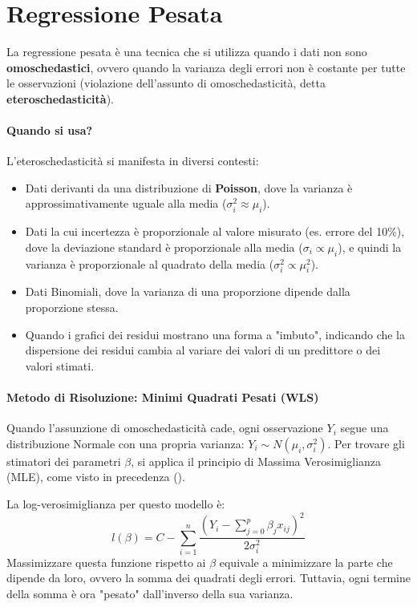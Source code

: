 \section{Regressione Pesata}

La regressione pesata è una tecnica che si utilizza quando i dati non sono
\textbf{omoschedastici}, ovvero quando la varianza degli errori non è costante
per tutte le osservazioni (violazione dell'assunto di omoschedasticità, detta
\textbf{eteroschedasticità}).

\paragraph{Quando si usa?}
L'eteroschedasticità si manifesta in diversi contesti:
\begin{itemize}
    \item Dati derivanti da una distribuzione di \textbf{Poisson}, dove la
    varianza è approssimativamente uguale alla media (\(\sigma_i^2 \approx
    \mu_i\)).
    \item Dati la cui incertezza è proporzionale al valore misurato (es. errore
    del 10\%), dove la deviazione standard è proporzionale alla media
    (\(\sigma_i \propto \mu_i\)), e quindi la varianza è proporzionale al
    quadrato della media (\(\sigma_i^2 \propto \mu_i^2\)).
    \item Dati Binomiali, dove la varianza di una proporzione dipende dalla
    proporzione stessa.
    \item Quando i grafici dei residui mostrano una forma a "imbuto", indicando
    che la dispersione dei residui cambia al variare dei valori di un predittore
    o dei valori stimati.
\end{itemize}

\paragraph{Metodo di Risoluzione: Minimi Quadrati Pesati (WLS)}
Quando l'assunzione di omoschedasticità cade, ogni osservazione \(Y_i\) segue
una distribuzione Normale con una propria varianza: \(Y_i \sim N(\mu_i,
\sigma_i^2)\). Per trovare gli stimatori dei parametri \(\beta\), si applica il
principio di Massima Verosimiglianza (MLE), come visto in precedenza
().

La log-verosimiglianza per questo modello è:
\[ l(\beta) = C - \sum_{i=1}^{n} \frac{(Y_i - \sum_{j=0}^{p} \beta_j
x_{ij})^2}{2\sigma_i^2} \]
Massimizzare questa funzione rispetto ai \(\beta\) equivale a minimizzare la
parte che dipende da loro, ovvero la somma dei quadrati degli errori. Tuttavia,
ogni termine della somma è ora "pesato" dall'inverso della sua varianza.

